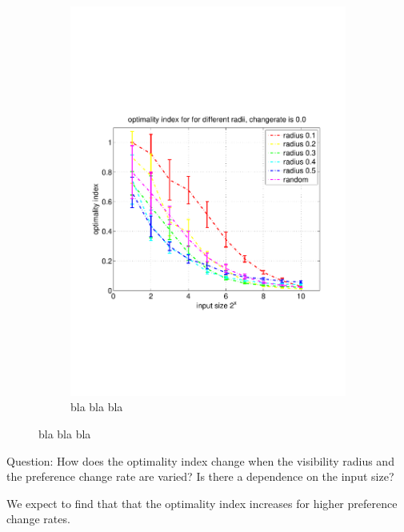 \documentclass[11pt]{article}
\begin{document}
\begin{figure}[t]
\begin{subfigure}[b]{0.4\textwidth}
	  \includegraphics[trim=0 180 0 180, clip, width=\textwidth]{../figures/figure_1}
	  \caption{bla bla bla}
	  \label{fig:optimality2}
	\end{subfigure}
\end{figure}

Question: How does the optimality index change when the visibility radius and the preference change rate are varied? Is there a dependence
on the input size?

We expect to find that that the optimality index increases for higher preference change rates.
\end{document}
